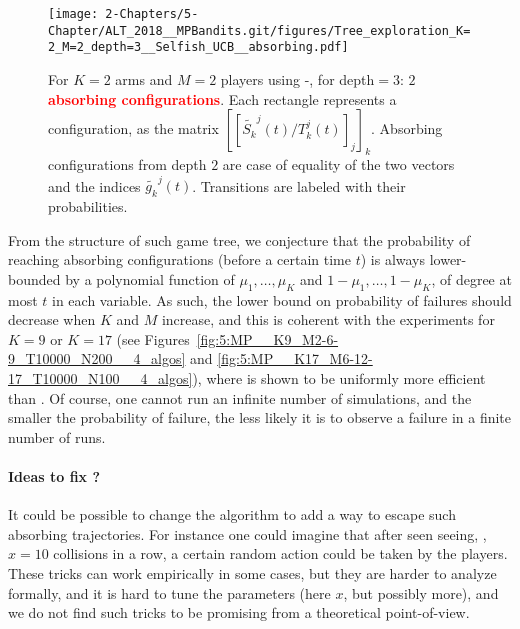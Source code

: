 \begin{figure}[h!]
    \centering
    \texttt{[image: 2-Chapters/5-Chapter/ALT\_2018\_\_MPBandits.git/figures/Tree\_exploration\_K=2\_M=2\_depth=3\_\_Selfish\_UCB\_\_absorbing.pdf]}
    \caption[Trajectories of $M=2$ players using \Selfish-\UCB{} for $K=2$ arms.]{For $K=2$ arms and $M=2$ players using \Selfish-\UCB, for depth$=3$: $2$ \textbf{\textcolor{red}{absorbing configurations}}. Each rectangle represents a configuration, as the matrix $[[\widetilde{S_k}^j(t) / T_k^j(t) ]_j]_k$. Absorbing configurations from depth $2$ are case of equality of the two vectors and the \Selfish{} indices $\widetilde{g_k}^j(t)$. Transitions are labeled with their probabilities.}
    \label{fig:5:oneGameTree_SelfishKLUCB}
\end{figure}

From the structure of such game tree, we conjecture that the probability of reaching absorbing configurations (before a certain time $t$) is always lower-bounded
by a polynomial function of $\mu_1,\dots,\mu_K$ and $1-\mu_1,\dots,1-\mu_K$,
of degree at most $t$ in each variable.
%
As such, the lower bound on probability of failures should decrease when $K$ and $M$ increase, and this is coherent with the experiments for $K=9$ or $K=17$ (see Figures~\ref{fig:5:MP__K9_M2-6-9_T10000_N200__4_algos} and \ref{fig:5:MP__K17_M6-12-17_T10000_N100__4_algos}),
where \Selfish{} is shown to be uniformly more efficient than \rhoRand.
%
Of course, one cannot run an infinite number of simulations, and the smaller the probability of failure, the less likely it is to observe a failure
in a finite number of runs.

\paragraph{Ideas to fix \Selfish{} ?}
%
It could be possible to change the \Selfish{} algorithm to add a way to escape such absorbing trajectories.
For instance one could imagine that after seen seeing, \eg, $x=10$ collisions in a row,
a certain random action could be taken by the players.
These tricks can work empirically in some cases,
but they are harder to analyze formally,
and it is hard to tune the parameters (here $x$, but possibly more),
and we do not find such tricks to be promising from a theoretical point-of-view.



